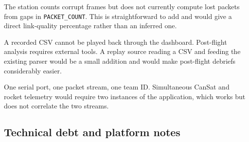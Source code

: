 \documentclass[11pt,a4paper]{article}
\newcommand{\code}[1]{\texttt{#1}}
\begin{document}
\begin{description}[leftmargin=0mm,labelwidth=0mm,labelsep=0mm,style=nextline,font=\normalfont\bfseries]
\item[No packet-loss statistic.] The station counts corrupt frames but does
not currently compute lost packets from gaps in \code{PACKET\_COUNT}. This
is straightforward to add and would give a direct link-quality percentage
rather than an inferred one.

\item[No session replay.] A recorded CSV cannot be played back through the
dashboard. Post-flight analysis requires external tools. A replay source
reading a CSV and feeding the existing parser would be a small addition and
would make post-flight debriefs considerably easier.

\item[Single-vehicle only.] One serial port, one packet stream, one team ID.
Simultaneous CanSat and rocket telemetry would require two instances of the
application, which works but does not correlate the two streams.

\end{description}

\subsection{Technical debt and platform notes}
\end{document}

